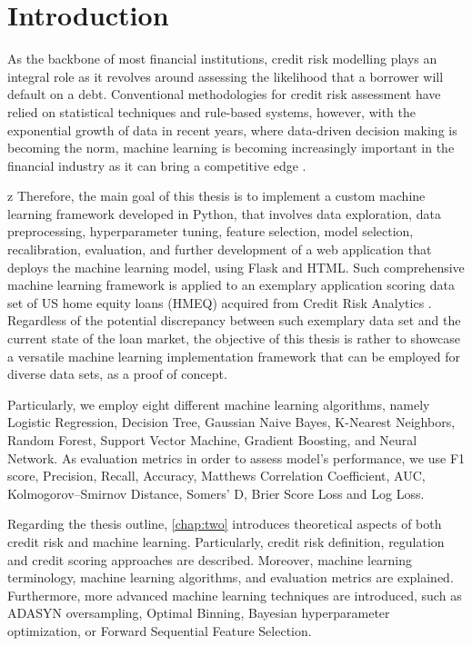 \chapter{Introduction}
\label{chap:one}

As the backbone of most financial institutions, credit risk modelling plays an integral role as it revolves around assessing the likelihood that a borrower will default on a debt.
Conventional methodologies for credit risk assessment have relied on statistical techniques and rule-based systems, however, with the exponential growth of data in recent years, where data-driven decision making is becoming the norm, machine learning is becoming increasingly important in the financial industry as it can bring a competitive edge \citep{PwC2023}.


z
Therefore, the main goal of this thesis is to implement a custom machine learning framework developed in Python, that involves data exploration, data preprocessing, hyperparameter tuning, feature selection, model selection, recalibration, evaluation, and further development of a web application that deploys the machine learning model, using Flask and HTML.
Such comprehensive machine learning framework is applied to an exemplary application scoring data set of US home equity loans (HMEQ) acquired from Credit Risk Analytics \citep{baesens2016credit}.
Regardless of the potential discrepancy between such exemplary data set and the current state of the loan market, the objective of this thesis is rather to showcase a versatile machine learning implementation framework that can be employed for diverse data sets, as a proof of concept.



Particularly, we employ eight different machine learning algorithms, namely Logistic Regression, Decision Tree, Gaussian Naive Bayes, K-Nearest Neighbors, Random Forest, Support Vector Machine, Gradient Boosting, and Neural Network.
As evaluation metrics in order to assess model's performance, we use F1 score, Precision, Recall, Accuracy, Matthews Correlation Coefficient, AUC, Kolmogorov--Smirnov Distance, Somers' D, Brier Score Loss and Log Loss.



Regarding the thesis outline, \autoref{chap:two} introduces theoretical aspects of both credit risk and machine learning. Particularly, credit risk definition, regulation and credit scoring approaches are described. Moreover, machine learning terminology, machine learning algorithms, and evaluation metrics are explained.
Furthermore, more advanced machine learning techniques are introduced, such as ADASYN oversampling, Optimal Binning, Bayesian hyperparameter optimization, or Forward Sequential Feature Selection.


